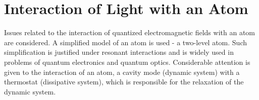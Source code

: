 \chapter{Interaction of Light with an Atom}
\label{chInteraction}

Issues related to the interaction of quantized electromagnetic fields with an atom are considered. A simplified model of an atom is used - a two-level atom. Such simplification is justified under resonant interactions and is widely used in problems of quantum electronics and quantum optics. Considerable attention is given to the interaction of an atom, a cavity mode (dynamic system) with a thermostat (dissipative system), which is responsible for the relaxation of the dynamic system.
















